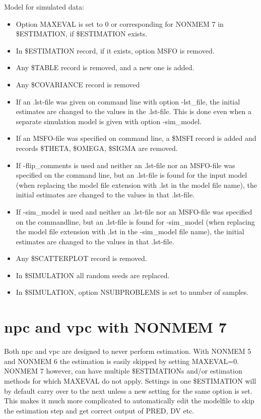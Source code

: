 Model for simulated data:
\begin{itemize}
	\item Option MAXEVAL is set to 0 or corresponding for  NONMEM 7 in \$ESTIMATION, if \$ESTIMATION exists.
	\item In \$ESTIMATION record, if it exists, option MSFO is removed.
	\item Any \$TABLE record is removed, and a new one is added.
	\item Any \$COVARIANCE record is removed
	\item If an .lst-file was given on command line with option -lst\_file, 
the initial estimates are changed to the values in the .lst-file. This is done even when a separate simulation model is given with option -sim\_model.
	\item If an MSFO-file was specified on command line, a \$MSFI record is added and records \$THETA, \$OMEGA, \$SIGMA are removed.  
	\item If -flip\_comments is used and neither an .lst-file nor an MSFO-file was specified on the command line, 
but an .lst-file is found for the input model (when replacing the model file extension 
with .lst in the model file name), 
the initial estimates are changed to the values in that .lst-file.
	\item If -sim\_model is used and neither an .lst-file nor an MSFO-file was specified on the commandline, 
but an .lst-file is found for -sim\_model 
(when replacing the model file extension with .lst in the -sim\_model file name), 
the initial estimates are changed to the values in that .lst-file.
	\item Any \$SCATTERPLOT record is removed.
	\item In \$SIMULATION all random seeds are replaced.      
	\item In \$SIMULATION, option NSUBPROBLEMS is set to number of samples.
\end{itemize}

\section{npc and vpc with NONMEM 7}
Both npc and vpc are designed to never perform estimation. With NONMEM 5 and NONMEM 6 the estimation is easily skipped by setting MAXEVAL=0. NONMEM 7 however, can have multiple \$ESTIMATIONs and/or estimation methods for which MAXEVAL do not apply. Settings in one \$ESTIMATION will by default carry over to the next unless a new setting for the same option is set. This makes it much more complicated to automatically edit the modelfile to skip the estimation step and get correct output of PRED, DV etc. 

